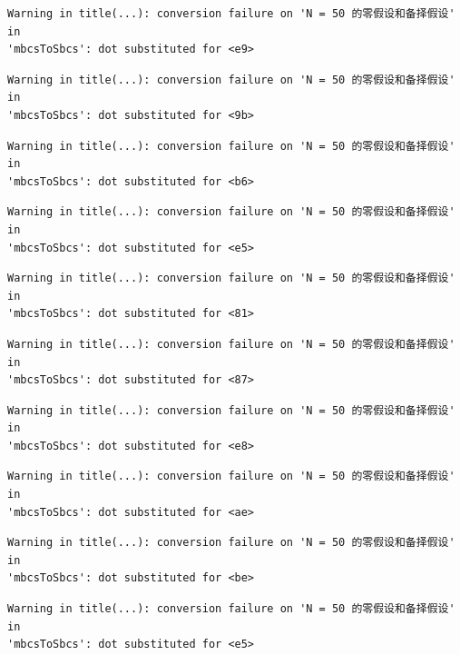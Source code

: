 \documentclass[
  letterpaper,
  DIV=11,
  numbers=noendperiod]{scrreprt}
\begin{document}
\begin{verbatim}
Warning in title(...): conversion failure on 'N = 50 的零假设和备择假设' in
'mbcsToSbcs': dot substituted for <e9>
\end{verbatim}

\begin{verbatim}
Warning in title(...): conversion failure on 'N = 50 的零假设和备择假设' in
'mbcsToSbcs': dot substituted for <9b>
\end{verbatim}

\begin{verbatim}
Warning in title(...): conversion failure on 'N = 50 的零假设和备择假设' in
'mbcsToSbcs': dot substituted for <b6>
\end{verbatim}

\begin{verbatim}
Warning in title(...): conversion failure on 'N = 50 的零假设和备择假设' in
'mbcsToSbcs': dot substituted for <e5>
\end{verbatim}

\begin{verbatim}
Warning in title(...): conversion failure on 'N = 50 的零假设和备择假设' in
'mbcsToSbcs': dot substituted for <81>
\end{verbatim}

\begin{verbatim}
Warning in title(...): conversion failure on 'N = 50 的零假设和备择假设' in
'mbcsToSbcs': dot substituted for <87>
\end{verbatim}

\begin{verbatim}
Warning in title(...): conversion failure on 'N = 50 的零假设和备择假设' in
'mbcsToSbcs': dot substituted for <e8>
\end{verbatim}

\begin{verbatim}
Warning in title(...): conversion failure on 'N = 50 的零假设和备择假设' in
'mbcsToSbcs': dot substituted for <ae>
\end{verbatim}

\begin{verbatim}
Warning in title(...): conversion failure on 'N = 50 的零假设和备择假设' in
'mbcsToSbcs': dot substituted for <be>
\end{verbatim}

\begin{verbatim}
Warning in title(...): conversion failure on 'N = 50 的零假设和备择假设' in
'mbcsToSbcs': dot substituted for <e5>
\end{verbatim}
\end{document}
